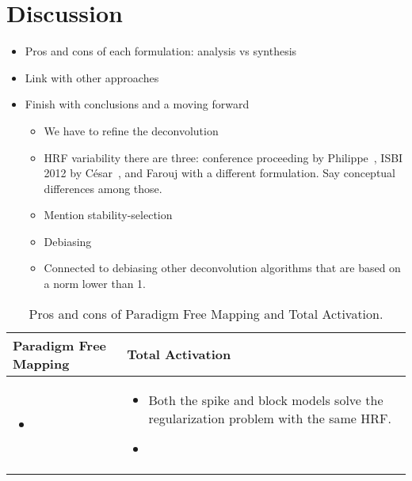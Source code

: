\section{Discussion}

\newcommand\pro{\item[$+$]}
\newcommand\con{\item[$-$]}

\begin{itemize}
    \item Pros and cons of each formulation: analysis vs synthesis
    \item Link with other approaches
    \item Finish with conclusions and a moving forward
    \begin{itemize}
        \item We have to refine the deconvolution
        \item HRF variability there are three: conference proceeding by Philippe~\cite{badillo2013group}, ISBI 2012 by César~\cite{gaudes2012structured}, and Farouj with a different formulation. Say conceptual differences among those.
        \item Mention stability-selection~\cite{meinshausen2010stability}
        \item Debiasing
        \item Connected to debiasing other deconvolution algorithms that are based on a norm lower than 1.
    \end{itemize}
\end{itemize}

\begin{table}
    \centering
    \begin{tabular}{ m{4cm} m{4cm} }
        Paradigm Free Mapping & Total Activation \\
        \toprule
        \begin{itemize}
            \pro 
        \end{itemize} &
        \begin{itemize}
            \pro Both the spike and block models solve the regularization problem with the same HRF.
            \con 
        \end{itemize} \\
    \end{tabular}
    \caption{Pros and cons of Paradigm Free Mapping and Total Activation.}
\end{table}

